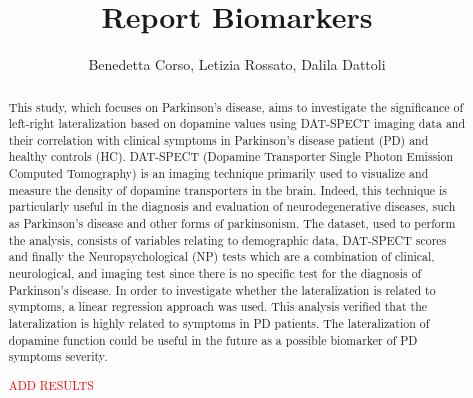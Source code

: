 \documentclass[]{article}
\title{Report Biomarkers}
\author{Benedetta Corso, Letizia Rossato, Dalila Dattoli}
\begin{document}
\maketitle

\begin{abstract}
This study, which focuses on Parkinson's disease, aims to investigate the significance of left-right lateralization based on dopamine values using DAT-SPECT imaging data and their correlation with clinical symptoms in Parkinson’s disease patient (PD) and healthy controls (HC). DAT-SPECT (Dopamine Transporter Single Photon Emission Computed Tomography) is an imaging technique primarily used to visualize and measure the density of dopamine transporters in the brain.  Indeed, this technique is particularly useful in the diagnosis and evaluation of neurodegenerative diseases, such as Parkinson's disease and other forms of parkinsonism. The dataset, used to perform the analysis, consists of variables relating to demographic data, DAT-SPECT scores and finally the Neuropsychological (NP) tests which are a combination of clinical, neurological, and imaging test since there is no specific test for the diagnosis of Parkinson’s disease. In order to investigate whether the lateralization is related to symptoms, a linear regression approach was used. This analysis verified that the lateralization is highly related to symptoms in PD patients.
The lateralization of dopamine function could be useful in the future as a possible biomarker of PD symptoms severity.

\textcolor{red}{ADD RESULTS}
\newline

\end{abstract}
\end{document}
